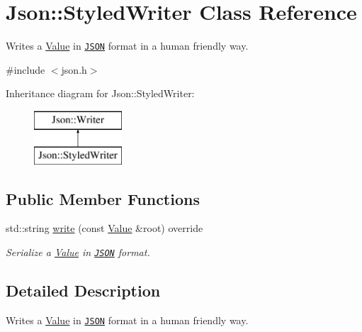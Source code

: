 \hypertarget{class_json_1_1_styled_writer}{\section{Json\-:\-:Styled\-Writer Class Reference}
\label{class_json_1_1_styled_writer}
}


Writes a \hyperlink{class_json_1_1_value}{Value} in \href{http://www.json.org}{\tt J\-S\-O\-N} format in a human friendly way.  




{\ttfamily \#include $<$json.\-h$>$}

Inheritance diagram for Json\-:\-:Styled\-Writer\-:\begin{figure}[H]
\begin{center}
\leavevmode
\includegraphics[height=2.000000cm]{class_json_1_1_styled_writer}
\end{center}
\end{figure}
\subsection*{Public Member Functions}
\begin{DoxyCompactItemize}
\item 
std\-::string \hyperlink{class_json_1_1_styled_writer_abd42ae0b8a788a46969fc51a28a496f5}{write} (const \hyperlink{class_json_1_1_value}{Value} \&root) override
\begin{DoxyCompactList}\small\item\em Serialize a \hyperlink{class_json_1_1_value}{Value} in \href{http://www.json.org}{\tt J\-S\-O\-N} format. \end{DoxyCompactList}\end{DoxyCompactItemize}


\subsection{Detailed Description}
Writes a \hyperlink{class_json_1_1_value}{Value} in \href{http://www.json.org}{\tt J\-S\-O\-N} format in a human friendly way. 

